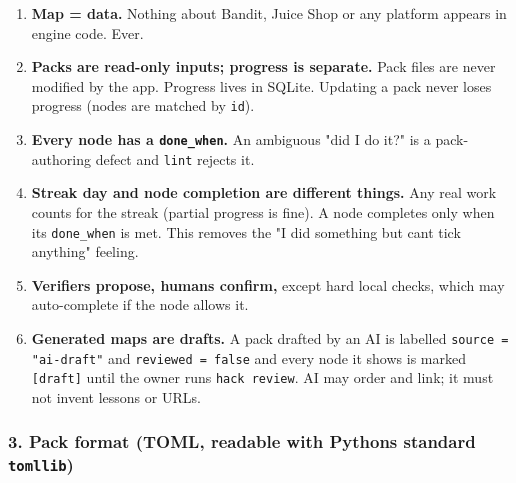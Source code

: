 \begin{enumerate}
\def\labelenumi{\arabic{enumi}.}
\tightlist
\item
  \textbf{Map = data.} Nothing about Bandit, Juice Shop or any platform
  appears in engine code. Ever.
\item
  \textbf{Packs are read-only inputs; progress is separate.} Pack files
  are never modified by the app. Progress lives in SQLite. Updating a
  pack never loses progress (nodes are matched by \texttt{id}).
\item
  \textbf{Every node has a \texttt{done\_when}.} An ambiguous "did I do
  it?" is a pack-authoring defect and \texttt{lint} rejects it.
\item
  \textbf{Streak day and node completion are different things.} Any real
  work counts for the streak (partial progress is fine). A node
  completes only when its \texttt{done\_when} is met. This removes the
  "I did something but can\textquotesingle t tick anything" feeling.
\item
  \textbf{Verifiers propose, humans confirm,} except hard local checks,
  which may auto-complete if the node allows it.
\item
  \textbf{Generated maps are drafts.} A pack drafted by an AI is
  labelled \texttt{source = "ai-draft"} and
  \texttt{reviewed = false} and every node it shows is marked
  \texttt{{[}draft{]}} until the owner runs \texttt{hack review}. AI
  may order and link; it must not invent lessons or URLs.
\end{enumerate}

\hypertarget{hackstreak-spec-v2-3-pack-format-toml-readable-with-pythons-standard-tomllib}{%
\subsubsection{\texorpdfstring{3. Pack format (TOML, readable with
Python\textquotesingle s standard
\texttt{tomllib})}{3. Pack format (TOML, readable with Python\textquotesingle s standard tomllib)}}\label{hackstreak-spec-v2-3-pack-format-toml-readable-with-pythons-standard-tomllib}}

